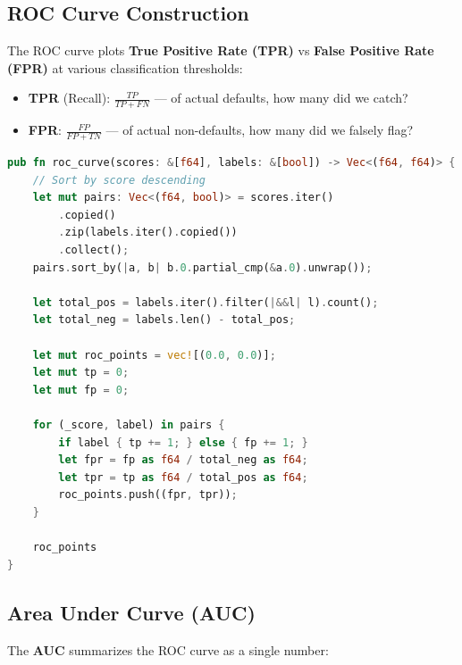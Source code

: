 \subsection{ROC Curve Construction}

The ROC curve plots \textbf{True Positive Rate (TPR)} vs \textbf{False Positive
Rate (FPR)} at various classification thresholds:

\begin{itemize}
    \item \textbf{TPR} (Recall): $\frac{TP}{TP + FN}$ --- of actual defaults, how many did we catch?
    \item \textbf{FPR}: $\frac{FP}{FP + TN}$ --- of actual non-defaults, how many did we falsely flag?
\end{itemize}


\begin{lstlisting}[language=Rust]
pub fn roc_curve(scores: &[f64], labels: &[bool]) -> Vec<(f64, f64)> {
    // Sort by score descending
    let mut pairs: Vec<(f64, bool)> = scores.iter()
        .copied()
        .zip(labels.iter().copied())
        .collect();
    pairs.sort_by(|a, b| b.0.partial_cmp(&a.0).unwrap());

    let total_pos = labels.iter().filter(|&&l| l).count();
    let total_neg = labels.len() - total_pos;

    let mut roc_points = vec![(0.0, 0.0)];
    let mut tp = 0;
    let mut fp = 0;

    for (_score, label) in pairs {
        if label { tp += 1; } else { fp += 1; }
        let fpr = fp as f64 / total_neg as f64;
        let tpr = tp as f64 / total_pos as f64;
        roc_points.push((fpr, tpr));
    }

    roc_points
}
\end{lstlisting}

\subsection{Area Under Curve (AUC)}

The \textbf{AUC} summarizes the ROC curve as a single number:


